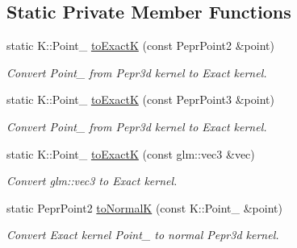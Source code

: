 \subsection*{Static Private Member Functions}
\begin{DoxyCompactItemize}
\item 
\mbox{\label{classpepr3d_1_1_triangle_detail_adeb9f4f75d811ad26309a4638bced4b0}} 
static K\+::\+Point\+\_ \mbox{\hyperlink{classpepr3d_1_1_triangle_detail_adeb9f4f75d811ad26309a4638bced4b0}{to\+ExactK}} (const Pepr\+Point2 \&point)
\begin{DoxyCompactList}\small\item\em Convert Point\+\_ from Pepr3d kernel to Exact kernel. \end{DoxyCompactList}\item 
\mbox{\label{classpepr3d_1_1_triangle_detail_afa092868a47bbadc6e4d48f4d985bfab}} 
static K\+::\+Point\+\_ \mbox{\hyperlink{classpepr3d_1_1_triangle_detail_afa092868a47bbadc6e4d48f4d985bfab}{to\+ExactK}} (const Pepr\+Point3 \&point)
\begin{DoxyCompactList}\small\item\em Convert Point\+\_ from Pepr3d kernel to Exact kernel. \end{DoxyCompactList}\item 
\mbox{\label{classpepr3d_1_1_triangle_detail_a1bab79b6e5843936aef0c47620a888ec}} 
static K\+::\+Point\+\_ \mbox{\hyperlink{classpepr3d_1_1_triangle_detail_a1bab79b6e5843936aef0c47620a888ec}{to\+ExactK}} (const glm\+::vec3 \&vec)
\begin{DoxyCompactList}\small\item\em Convert glm\+::vec3 to Exact kernel. \end{DoxyCompactList}\item 
\mbox{\label{classpepr3d_1_1_triangle_detail_ac85fa082aaa6c3f8cddca396516857d5}} 
static Pepr\+Point2 \mbox{\hyperlink{classpepr3d_1_1_triangle_detail_ac85fa082aaa6c3f8cddca396516857d5}{to\+NormalK}} (const K\+::\+Point\+\_ \&point)
\begin{DoxyCompactList}\small\item\em Convert Exact kernel Point\+\_ to normal Pepr3d kernel. \end{DoxyCompactList}\item 

\end{DoxyCompactItemize}

